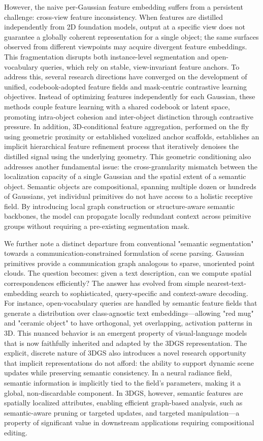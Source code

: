 \documentclass[11pt,a4paper]{article}
\begin{document}
However, the naive per-Gaussian feature embedding suffers from a persistent challenge: cross-view feature inconsistency. When features are distilled independently from 2D foundation models, output at a specific view does not guarantee a globally coherent representation for a single object; the same surfaces observed from different viewpoints may acquire divergent feature embeddings. This fragmentation disrupts both instance-level segmentation and open-vocabulary queries, which rely on stable, view-invariant feature anchors. To address this, several research directions have converged on the development of unified, codebook-adopted feature fields and mask-centric contrastive learning objectives. Instead of optimizing features independently for each Gaussian, these methods couple feature learning with a shared codebook or latent space, promoting intra-object cohesion and inter-object distinction through contrastive pressure. In addition, 3D-conditional feature aggregation, performed on the fly using geometric proximity or established voxelized anchor scaffolds, establishes an implicit hierarchical feature refinement process that iteratively denoises the distilled signal using the underlying geometry. This geometric conditioning also addresses another fundamental issue: the cross-granularity mismatch between the localization capacity of a single Gaussian and the spatial extent of a semantic object. Semantic objects are compositional, spanning multiple dozen or hundreds of Gaussians, yet individual primitives do not have access to a holistic receptive field. By introducing local graph construction or structure-aware semantic backbones, the model can propagate locally redundant context across primitive groups without requiring a pre-existing segmentation mask.

We further note a distinct departure from conventional "semantic segmentation" towards a communication-constrained formulation of scene parsing. Gaussian primitives provide a communication graph analogous to sparse, unoriented point clouds. The question becomes: given a text description, can we compute spatial correspondences efficiently? The answer has evolved from simple nearest-text-embedding search to sophisticated, query-specific and context-aware decoding. For instance, open-vocabulary queries are handled by semantic feature fields that generate a distribution over class-agnostic text embeddings---allowing "red mug" and "ceramic object" to have orthogonal, yet overlapping, activation patterns in 3D. This nuanced behavior is an emergent property of visual-language models that is now faithfully inherited and adapted by the 3DGS representation. The explicit, discrete nature of 3DGS also introduces a novel research opportunity that implicit representations do not afford: the ability to support dynamic scene updates while preserving semantic consistency. In a neural radiance field, semantic information is implicitly tied to the field's parameters, making it a global, non-discardable component. In 3DGS, however, semantic features are spatially localized attributes, enabling efficient graph-based analysis, such as semantic-aware pruning or targeted updates, and targeted manipulation---a property of significant value in downstream applications requiring compositional editing.
\end{document}
